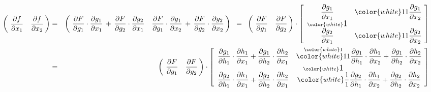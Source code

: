 \begin{eqnarray*}
\left(\!\begin{array}{cc}
	\dfrac{\partial f}{\partial x_{1}} & \dfrac{\partial f}{\partial x_{2}}
	\end{array}\!\!\right)
& = &
\left(\!\begin{array}{cc}
	\dfrac{\partial F}{\partial g_{1}} \cdot \dfrac{\partial g_{1}}{\partial x_{1}}
		\, + \,
		\dfrac{\partial F}{\partial g_{2}} \cdot \dfrac{\partial g_{2}}{\partial x_{1}}
	&
	\dfrac{\partial F}{\partial g_{1}}
		\cdot
		\dfrac{\partial g_{1}}{\partial x_{2}}
		\, + \,
		\dfrac{\partial F}{\partial g_{2}} \cdot \dfrac{\partial g_{2}}{\partial x_{2}}
	\end{array}\!\!\right)
\;\; = \;\;
\left(\!\begin{array}{cc}
	\dfrac{\partial F}{\partial g_{1}} & \dfrac{\partial F}{\partial g_{2}}
	\end{array}\!\!\right)
\cdot
\left[\begin{array}{cc}
	\dfrac{\partial g_{1}}{\partial x_{1}}
	&
	{\color{white}11}
	\dfrac{\partial g_{1}}{\partial x_{2}}
	\\
	\overset{{\color{white}\textnormal{\large1}}}{\dfrac{\partial g_{2}}{\partial x_{1}}}
	&
	{\color{white}11}
	\dfrac{\partial g_{2}}{\partial x_{2}}
	\end{array}\!\right]
\\
& = &
\left(\!\begin{array}{cc}
	\dfrac{\partial F}{\partial g_{1}} & \dfrac{\partial F}{\partial g_{2}}
	\end{array}\!\!\right)
\cdot
\left[\begin{array}{cc}
	\dfrac{\partial g_{1}}{\partial h_{1}} \cdot \dfrac{\partial h_{1}}{\partial x_{1}}
		+
		\dfrac{\partial g_{1}}{\partial h_{2}} \cdot \dfrac{\partial h_{2}}{\partial x_{1}}
	&
	\overset{{\color{white}1}}{{\color{white}11}}
	\dfrac{\partial g_{1}}{\partial h_{1}} \cdot \dfrac{\partial h_{1}}{\partial x_{2}}
		+
		\dfrac{\partial g_{1}}{\partial h_{2}} \cdot \dfrac{\partial h_{2}}{\partial x_{2}}
	\\
	\dfrac{\partial g_{2}}{\partial h_{1}} \cdot \dfrac{\partial h_{1}}{\partial x_{1}}
		+
		\dfrac{\partial g_{2}}{\partial h_{2}} \cdot \dfrac{\partial h_{2}}{\partial x_{1}}
	&
	\overset{{\color{white}\textnormal{\large1}}}{{\color{white}\dfrac{1}{1}}}
	\dfrac{\partial g_{2}}{\partial h_{1}} \cdot \dfrac{\partial h_{1}}{\partial x_{2}}
		+
		\dfrac{\partial g_{2}}{\partial h_{2}} \cdot \dfrac{\partial h_{2}}{\partial x_{2}}
	\end{array}\!\right]

\end{eqnarray*}

